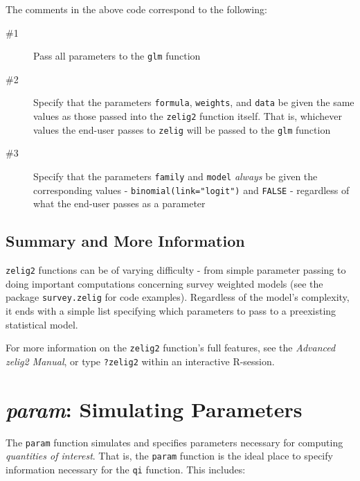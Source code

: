 \documentclass{article}
\newcommand{\code}[1]{{\tt #1}}
\begin{document}
\noindent The comments in the above code correspond to the following:

\begin{description}
	\item[ \#1 ] Pass all parameters to the \code{glm} function

	\item[ \#2 ] Specify that the parameters \code{formula}, \code{weights},
	and \code{data} be given the same values as those passed into the
	\code{zelig2} function itself. That is, whichever values the end-user
	passes to \code{zelig} will be passed to the \code{glm} function

	\item[ \#3 ] Specify that the parameters \code{family} and \code{model}
	\emph{always} be given the corresponding values -
	\code{binomial(link="logit")} and \code{FALSE} - regardless of what
	the end-user passes as a parameter
	
\end{description}


\subsection{Summary and More Information}

\code{zelig2} functions can be of varying difficulty - from simple parameter
passing to doing important computations concerning survey weighted models
(see the package \code{survey.zelig} for code examples). Regardless of the model's
complexity, it ends with a simple list specifying which parameters to pass to
a preexisting statistical model.

For more information on the \code{zelig2} function's full features, see
the \emph{Advanced zelig2 Manual}, or type \code{?zelig2} within an interactive R-session.


\pagebreak
\section{\emph{param}: Simulating Parameters}
\label{section:param}


The \code{param} function simulates and specifies parameters necessary for computing
\emph{quantities of interest}. That is, the \code{param} function is the ideal place
to specify information necessary for the \code{qi} function. This includes:
\end{document}
